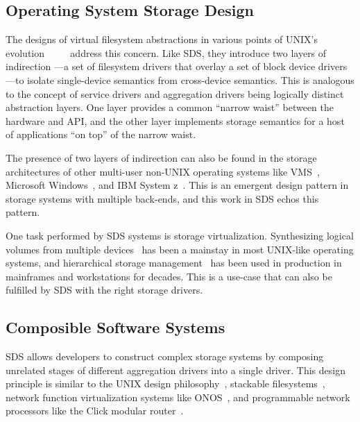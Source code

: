 \subsection{Operating System Storage Design}

The designs of virtual filesystem abstractions in various points of UNIX's evolution
~\cite{vnodes-sun-1986}~\cite{netbsd4.4-vfs-1995}~\cite{plan9-filesystem}~\cite{freebsd-design-book}
address this concern.  Like SDS, they introduce two layers of indirection
---a set of filesystem drivers that overlay a set of block device drivers---to
isolate single-device semantics from cross-device semantics.  This is analogous
to the concept of service drivers and aggregation drivers being logically
distinct abstraction layers.  One layer provides a common ``narrow waist''
between the hardware and API, and the other layer implements storage semantics
for a host of applications ``on top'' of the narrow waist.

The presence of two layers of indirection can also be found in the storage
architectures of other multi-user non-UNIX
operating systems like VMS~\cite{vms-driver-model}, Microsoft
Windows~\cite{ms-windows-driver-model}, and IBM System z~\cite{ibm-vsam}.
This is an emergent design pattern in storage systems with multiple
back-ends, and this work in SDS echos this pattern.

One task performed by SDS systems is storage virtualization.  Synthesizing
logical volumes from multiple devices~\cite{lvm} has been a mainstay in most UNIX-like
operating systems, and hierarchical storage management~\cite{hp-hsm} has been used
in production in mainframes and workstations for decades.  This is a use-case that can also be
fulfilled by SDS with the right storage drivers.

\subsection{Composible Software Systems}

SDS allows developers to construct complex storage systems by composing
unrelated stages of different aggregation drivers into a single driver.
This design principle is similar to the UNIX design philosophy~\cite{unix-design-philosophy},
stackable filesystems~\cite{stackable-filesystems}, network function virtualization systems
like ONOS~\cite{onos},
and programmable network processors like the Click modular router~\cite{click-modular-router}.

